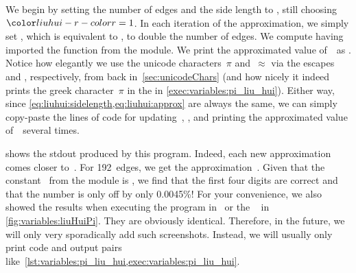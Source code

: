 We begin by setting the number of edges  and the side length to , still choosing~$\liuhuir=1$.
In each iteration of the approximation, we simply set \pythonIdx{*=}, which is equivalent to , to double the number of edges.
We compute  having imported the  function from the  module.
We print the approximated value of~\numberPi\ as .
Notice how elegantly we use the unicode characters~$\pi$ and~$\approx$ via the escapes~ and , respectively, from back in~\cref{sec:unicodeChars} (and how nicely it indeed prints the greek character~$\pi$ in the  in \cref{exec:variables:pi_liu_hui}).
Either way, since \cref{eq:liuhui:sidelength,eq:liuhui:approx} are always the same, we can simply copy-paste the lines of code for updating~, , and printing the approximated value of~\numberPi\ several times.

 shows the \acrfull{stdout} produced by this program.
Indeed, each new approximation comes closer to~\numberPi.
For 192~edges, we get the approximation~.
Given that the constant~ from the  module is , we find that the first four digits are correct and that the number is only off by only 0.0045\%!
For your convenience, we also showed the results when executing the program in \pycharm\ or the \ubuntu\  in \cref{fig:variables:liuHuiPi}.
They are obviously identical.
Therefore, in the future, we will only very sporadically add such screenshots.
Instead, we will usually only print code and output pairs like~\cref{lst:variables:pi_liu_hui,exec:variables:pi_liu_hui}.%
%
\endhsection%
%
\FloatBarrier%
\endhsection%
%
